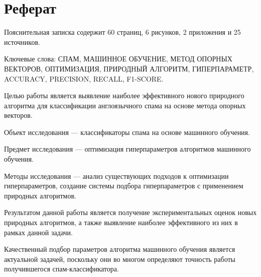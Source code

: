 \chapter*{Реферат}
\thispagestyle{plain}
Пояснительная записка содержит 60 страниц, 6 рисунков, 2 приложения и 25 источников.

Ключевые слова: СПАМ, МАШИННОЕ ОБУЧЕНИЕ, МЕТОД ОПОРНЫХ ВЕКТОРОВ, ОПТИМИЗАЦИЯ, 
ПРИРОДНЫЙ АЛГОРИТМ, ГИПЕРПАРАМЕТР, ACCURACY, PRECISION, RECALL, F1-SCORE.

Целью работы является выявление наиболее эффективного нового природного алгоритма 
для классификации англоязычного спама на основе метода опорных векторов. 

Объект исследования — классификаторы спама на основе машинного обучения. 

Предмет исследования — оптимизация гиперпараметров алгоритмов машинного обучения.

Методы исследования — анализ существующих подходов к оптимизации гиперпараметров, 
создание системы подбора гиперпараметров с применением природных алгоритмов.

Результатом данной работы является получение экспериментальных оценок новых 
природных алгоритмов, а также выявление наиболее эффективного из них 
в рамках данной задачи.

Качественный подбор параметров алгоритма машинного обучения является актуальной задачей, 
поскольку они во многом определяют точность работы получившегося спам-классификатора.